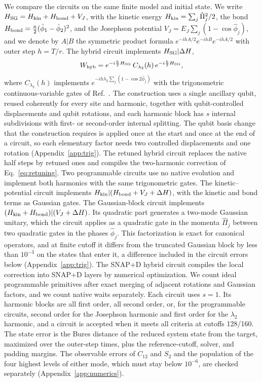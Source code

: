 \documentclass[pra,twocolumn,superscriptaddress,nofootinbib,floatfix]{revtex4-2}
\theoremstyle{remark}
\begin{document}
We compare the circuits on the same finite model and initial state. We write \(H_{\rm SG}=H_{\rm kin}+H_{\rm bond}+V_J\), with the kinetic energy \(H_{\rm kin}=\sum_j\hat\Pi_j^2/2\), the bond \(H_{\rm bond}=\tfrac{\kappa}{2}(\hat\phi_1-\hat\phi_2)^2\), and the Josephson potential \(V_J=E_J\sum_j(1-\cos\hat\phi_j)\), and we denote by \(A|B\) the symmetric product formula \(e^{-ihA/2}e^{-ihB}e^{-ihA/2}\) with outer step \(h=T/r\). The hybrid circuit implements \(H_{\rm SG}|\Delta H\),
\begin{align}
W_{\rm hyb}=e^{-i\frac h2H_{\rm SG}}\,C_{\lambda_2}(h)\,e^{-i\frac h2H_{\rm SG}},
\end{align}
where \(C_{\lambda_2}(h)\) implements \(e^{-ih\lambda_2\sum_j(1-\cos2\hat\phi_j)}\) with the trigonometric continuous-variable gates of Ref.~\cite{Rainaldi2026TrigonometricCV}. The construction uses a single ancillary qubit, reused coherently for every site and harmonic, together with qubit-controlled displacements and qubit rotations, and each harmonic block has \(s\) internal subdivisions with first- or second-order internal splitting. The qubit basis change that the construction requires is applied once at the start and once at the end of a circuit, so each elementary factor needs two controlled displacements and one rotation (Appendix~\ref{app:trig}). The retuned hybrid circuit replaces the native half steps by retuned ones and compiles the two-harmonic correction of Eq.~\eqref{eq:retuning}. Two programmable circuits use no native evolution and implement both harmonics with the same trigonometric gates. The kinetic--potential circuit implements \(H_{\rm kin}|(H_{\rm bond}+V_J+\Delta H)\), with the kinetic and bond terms as Gaussian gates. The Gaussian-block circuit implements \((H_{\rm kin}+H_{\rm bond})|(V_J+\Delta H)\). Its quadratic part generates a two-mode Gaussian unitary, which the circuit applies as a quadratic gate in the momenta \(\hat\Pi_j\) between two quadratic gates in the phases \(\hat\phi_j\). This factorization is exact for canonical operators, and at finite cutoff it differs from the truncated Gaussian block by less than \(10^{-3}\) on the states that enter it, a difference included in the circuit errors below (Appendix~\ref{app:trig}). The SNAP+D hybrid circuit compiles the local correction into SNAP+D layers by numerical optimization. We count ideal programmable primitives after exact merging of adjacent rotations and Gaussian factors, and we count native waits separately. Each circuit uses \(s=1\). Its harmonic blocks are all first order, all second order, or, for the programmable circuits, second order for the Josephson harmonic and first order for the \(\lambda_2\) harmonic, and a circuit is accepted when it meets all criteria at cutoffs 128/160. The state error is the Bures distance of the reduced system state from the target, maximized over the outer-step times, plus the reference-cutoff, solver, and padding margins. The observable errors of \(C_{12}\) and \(S_2\) and the population of the four highest levels of either mode, which must stay below \(10^{-6}\), are checked separately (Appendix~\ref{app:numerics}).
\end{document}

